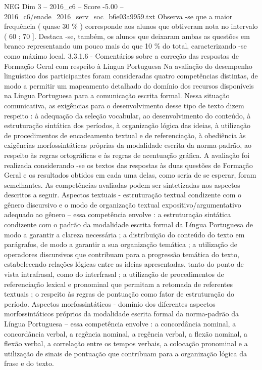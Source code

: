 \begin{textsample}{NEG Dim 3 – 2016\_c6 – Score -5.00 – 2016\_c6/enade\_2016\_serv\_soc\_b6e03a9959.txt}
Observa -se que a maior frequência ( quase 30 \% ) corresponde aos alunos que obtiveram nota no intervalo ( 60 ; 70 ].
Destaca -se, também, os alunos que deixaram ambas as questões em branco representando um pouco mais do que 10 \% do total, caracterizando -se como máximo local. 3.3.1.6 - Comentários sobre a correção das respostas de Formação Geral com respeito à Língua Portuguesa Na avaliação do desempenho linguístico dos participantes foram consideradas quatro competências distintas, de modo a permitir um mapeamento detalhado do domínio dos recursos disponíveis na Língua Portuguesa para a comunicação escrita formal.
Nessa situação comunicativa, as exigências para o desenvolvimento desse tipo de texto dizem respeito : à adequação da seleção vocabular, ao desenvolvimento do conteúdo, à estruturação sintática dos períodos, à organização lógica das ideias, à utilização de procedimentos de encadeamento textual e de referenciação, à obediência às exigências morfossintáticas próprias da modalidade escrita da norma-padrão, ao respeito às regras ortográficas e às regras de acentuação gráfica.
A avaliação foi realizada considerando -se os textos das respostas às duas questões de Formação Geral e os resultados obtidos em cada uma delas, como seria de se esperar, foram semelhantes.
As competências avaliadas podem ser sintetizadas nos aspectos descritos a seguir.
Aspectos textuais - estruturação textual condizente com o gênero discursivo e o modo de organização textual expositivo/argumentativo adequado ao gênero – essa competência envolve : a estruturação sintática condizente com o padrão da modalidade escrita formal da Língua Portuguesa de modo a garantir a clareza necessária ; a distribuição do conteúdo do texto em parágrafos, de modo a garantir a sua organização temática ; a utilização de operadores discursivos que contribuam para a progressão temática do texto, estabelecendo relações lógicas entre as ideias apresentadas, tanto do ponto de vista intrafrasal, como do interfrasal ; a utilização de procedimentos de referenciação lexical e pronominal que permitam a retomada de referentes textuais ; o respeito às regras de pontuação como fator de estruturação do período.
Aspectos morfossintáticos - domínio dos diferentes aspectos morfossintáticos próprios da modalidade escrita formal da norma-padrão da Língua Portuguesa – essa competência envolve : a concordância nominal, a concordância verbal, a regência nominal, a regência verbal, a flexão nominal, a flexão verbal, a correlação entre os tempos verbais, a colocação pronominal e a utilização de sinais de pontuação que contribuam para a organização lógica da frase e do texto.

\end{textsample}
